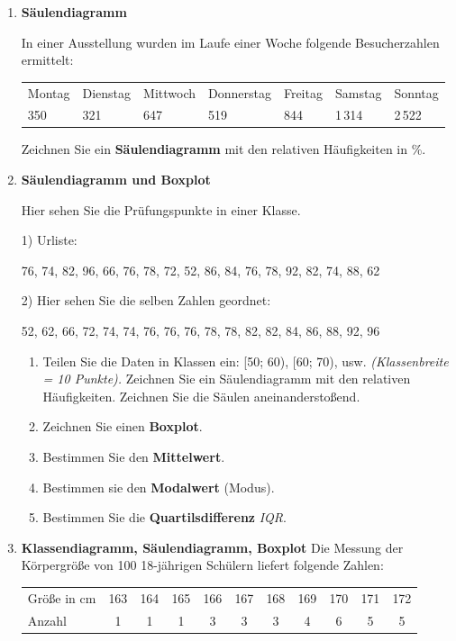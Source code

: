 \begin{enumerate}
\item \textbf{Säulendiagramm}

  In einer Ausstellung wurden im Laufe einer Woche folgende
  Besucherzahlen ermittelt:

  \begin{tabular}{lllllll}
    Montag & Dienstag & Mittwoch & Donnerstag & Freitag & Samstag & Sonntag \\
    350    & 321      & 647      & 519        & 844     & 1\,314  & 2\,522
  \end{tabular}

  Zeichnen Sie ein \textbf{Säulendiagramm} mit den relativen
  Häufigkeiten in \%.

\item \textbf{Säulendiagramm und Boxplot}

  Hier sehen Sie die Prüfungspunkte in einer Klasse.

  1) Urliste:

  76, 74, 82, 96, 66, 76, 78, 72, 52, 86, 84, 76, 78, 92, 82, 74, 88,
  62

  2) Hier sehen Sie die selben Zahlen geordnet:

  52, 62, 66, 72, 74, 74, 76, 76, 76, 78, 78, 82, 82, 84, 86, 88, 92, 96

  \begin{enumerate}[label=\alph*)]
  \item
    Teilen Sie die Daten in Klassen ein: [50; 60), [60; 70), usw.
        \textit{(Klassenbreite = 10 Punkte).} Zeichnen Sie ein
        Säulendiagramm mit den relativen Häufigkeiten. Zeichnen Sie
        die Säulen aneinanderstoßend.

      \item
        Zeichnen Sie einen \textbf{Boxplot}.
      \item
        Bestimmen Sie den \textbf{Mittelwert}.
      \item
        Bestimmen sie den \textbf{Modalwert} (Modus).
      \item
        Bestimmen Sie die \textbf{Quartilsdifferenz} \textit{IQR}.
    \end{enumerate}

\item \textbf{Klassendiagramm, Säulendiagramm, Boxplot}
 Die Messung der Körpergröße von 100 18-jährigen Schülern liefert
 folgende Zahlen:

 \begin{tabular}{lcccccccccc}
   Größe in cm & 163 & 164 & 165 & 166 & 167 & 168 & 169 & 170 & 171 & 172\\
   Anzahl      &  1  &  1  &  1  &  3  &  3  &  3  &  4  &  6  &  5  &  5
   \end{tabular}


\end{enumerate}
